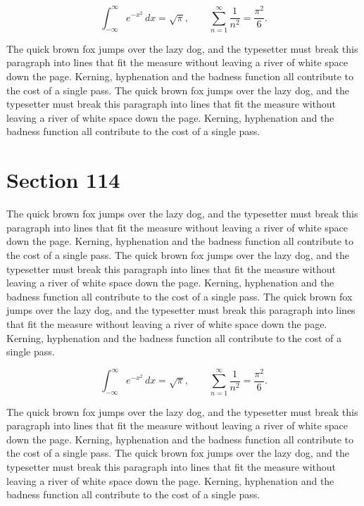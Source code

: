 \documentclass{article}
\begin{document}
\begin{equation}
\int_{-\infty}^{\infty} e^{-x^{2}}\,dx = \sqrt{\pi}, \qquad
\sum_{n=1}^{\infty} \frac{1}{n^{2}} = \frac{\pi^{2}}{6}.
\end{equation}

The quick brown fox jumps over the lazy dog, and the typesetter must break this paragraph into lines that fit the measure without leaving a river of white space down the page. Kerning, hyphenation and the badness function all contribute to the cost of a single pass. The quick brown fox jumps over the lazy dog, and the typesetter must break this paragraph into lines that fit the measure without leaving a river of white space down the page. Kerning, hyphenation and the badness function all contribute to the cost of a single pass. 
\section{Section 114}
The quick brown fox jumps over the lazy dog, and the typesetter must break this paragraph into lines that fit the measure without leaving a river of white space down the page. Kerning, hyphenation and the badness function all contribute to the cost of a single pass. The quick brown fox jumps over the lazy dog, and the typesetter must break this paragraph into lines that fit the measure without leaving a river of white space down the page. Kerning, hyphenation and the badness function all contribute to the cost of a single pass. The quick brown fox jumps over the lazy dog, and the typesetter must break this paragraph into lines that fit the measure without leaving a river of white space down the page. Kerning, hyphenation and the badness function all contribute to the cost of a single pass. 

\begin{equation}
\int_{-\infty}^{\infty} e^{-x^{2}}\,dx = \sqrt{\pi}, \qquad
\sum_{n=1}^{\infty} \frac{1}{n^{2}} = \frac{\pi^{2}}{6}.
\end{equation}

The quick brown fox jumps over the lazy dog, and the typesetter must break this paragraph into lines that fit the measure without leaving a river of white space down the page. Kerning, hyphenation and the badness function all contribute to the cost of a single pass. The quick brown fox jumps over the lazy dog, and the typesetter must break this paragraph into lines that fit the measure without leaving a river of white space down the page. Kerning, hyphenation and the badness function all contribute to the cost of a single pass. 
\end{document}
